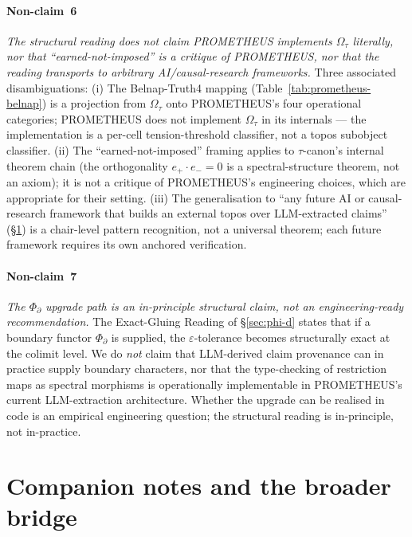 \documentclass{pantarhei-researchnote}
\newcommand{\PsiD}{\ensuremath{\Phi_{\partial}}}
\newcommand{\Omegatau}{\ensuremath{\Omega_{\tau}}}
\begin{document}
\paragraph{Non-claim~6}
\emph{The structural reading does not claim PROMETHEUS implements
$\Omegatau$ literally, nor that ``earned-not-imposed'' is a
critique of PROMETHEUS, nor that the reading transports to
arbitrary AI/causal-research frameworks.} Three associated
disambiguations: (i) The Belnap-Truth4 mapping (Table~\ref{tab:prometheus-belnap})
is a projection from $\Omegatau$ onto PROMETHEUS's four
operational categories; PROMETHEUS does not implement $\Omegatau$
in its internals --- the implementation is a per-cell
tension-threshold classifier, not a topos subobject classifier.
(ii) The ``earned-not-imposed'' framing applies to $\tau$-canon's
internal theorem chain (the orthogonality $e_{+} \cdot e_{-} = 0$ is
a spectral-structure theorem, not an axiom); it is not a critique
of PROMETHEUS's engineering choices, which are appropriate for
their setting. (iii) The generalisation to ``any future AI or
causal-research framework that builds an external topos over
LLM-extracted claims'' (\S\ref{sec:companion}) is a chair-level
pattern recognition, not a universal theorem; each future framework
requires its own anchored verification.

\paragraph{Non-claim~7}
\emph{The $\PsiD$ upgrade path is an in-principle structural claim,
not an engineering-ready recommendation.} The Exact-Gluing Reading
of \S\ref{sec:phi-d} states that if a boundary functor $\PsiD$ is
supplied, the $\varepsilon$-tolerance becomes structurally exact at
the colimit level. We do \emph{not} claim that LLM-derived claim
provenance can in practice supply boundary characters, nor that the
type-checking of restriction maps as spectral morphisms is
operationally implementable in PROMETHEUS's current LLM-extraction
architecture. Whether the upgrade can be realised in code is an
empirical engineering question; the structural reading is
in-principle, not in-practice.

\section{Companion notes and the broader bridge}
\label{sec:companion}
\end{document}
